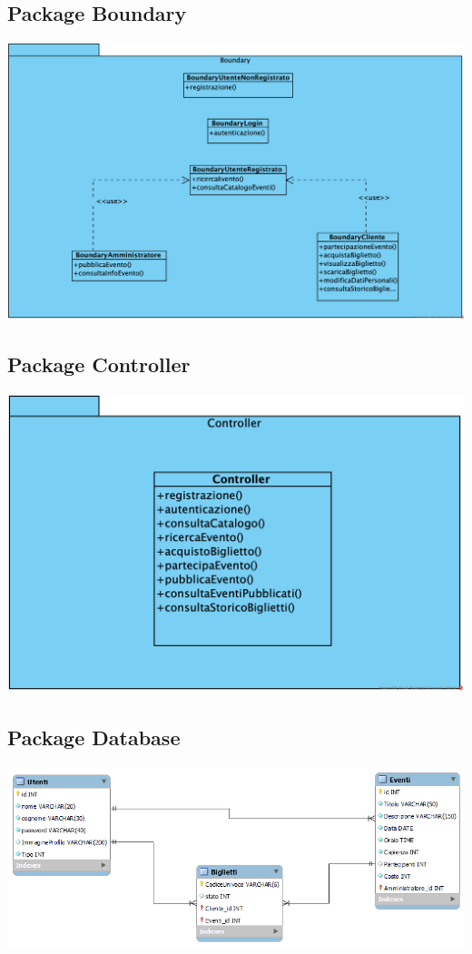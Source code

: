 \subsection{Package Boundary}
\begin{center}	
	\vspace{1ex}
	\includegraphics[height=0.38\linewidth]{assets/package/Boundary.png}
	\vspace{1ex}
\end{center}
\subsection{Package Controller}
\begin{center}	
	\vspace{1ex}
	\includegraphics[height=0.38\linewidth]{assets/package/Controller.png}
	\vspace{1ex}
\end{center}
\subsection{Package Database}


\begin{center}	
	\vspace{1ex}
	\includegraphics[height=0.38\linewidth]{assets/package/erdiagram.png}
	\vspace{1ex}
\end{center}


